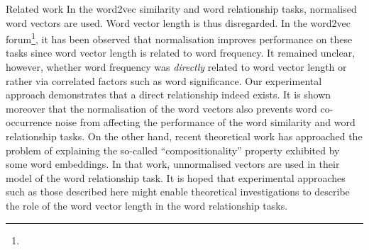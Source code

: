 \documentclass{article} %
\begin{document}
\begin{section}{Related work}
In the word2vec similarity and word relationship tasks, normalised word vectors are used.
Word vector length is thus disregarded.
In the word2vec forum\footnote{\googlegroup}, it has been observed that normalisation improves performance on these tasks since word vector length is related to word frequency.
It remained unclear, however, whether word frequency was \textit{directly} related to word vector length or rather via correlated factors such as word significance.
Our experimental approach demonstrates that a direct relationship indeed exists.
It is shown moreover that the normalisation of the word vectors also prevents word co-occurrence noise from affecting the performance of the word similarity and word relationship tasks.
On the other hand, recent theoretical work \cite{Arora2015} has approached the problem of explaining the so-called ``compositionality'' property exhibited by some word embeddings.
In that work, unnormalised vectors are used in their model of the word relationship task.
It is hoped that experimental approaches such as those described here might enable theoretical investigations to describe the role of the word vector length in the word relationship tasks.
\end{section}
\end{document}
